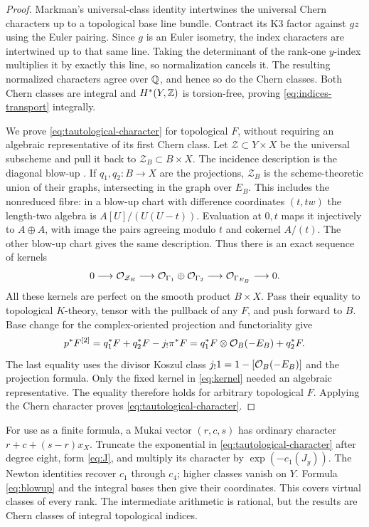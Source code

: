 \begin{proof}
Markman's universal-class identity intertwines the universal Chern
characters up to a topological base line bundle. Contract its K3
factor against $gz$ using the Euler pairing. Since $g$ is an
Euler isometry, the index characters are intertwined up to that
same line. Taking the determinant of the rank-one $y$-index
multiplies it by exactly this line, so normalization cancels it.
The resulting normalized characters agree over $\mathbb Q$, and hence
so do the Chern classes. Both Chern classes are integral and
$H^*(Y,\mathbb Z)$ is torsion-free, proving
\eqref{eq:indices-transport} integrally.

We prove \eqref{eq:tautological-character} for topological $F$,
without requiring an algebraic representative of its first
Chern class. Let $\mathcal Z\subset Y\times X$ be the
universal subscheme and pull it back to $\mathcal Z_B\subset
B\times X$. The incidence description is the diagonal blow-up
\cite[\S10, diagram~(54)]{sv}. If $q_1,q_2:B\to X$
are the projections, $\mathcal Z_B$ is the scheme-theoretic
union of their graphs, intersecting in the graph over $E_B$.
This includes the nonreduced fibre: in a blow-up chart with
difference coordinates $(t,tw)$ the length-two algebra is
$A[U]/(U(U-t))$. Evaluation at $0,t$ maps it injectively to
$A\oplus A$, with image the pairs agreeing modulo $t$ and
cokernel $A/(t)$. The other blow-up chart gives the same
description. Thus there is an exact sequence of kernels
\begin{equation}\label{eq:kernel}
 0\longrightarrow\mathcal O_{\mathcal Z_B}\longrightarrow
 \mathcal O_{\Gamma_1}\oplus\mathcal O_{\Gamma_2}\longrightarrow
 \mathcal O_{\Gamma_{E_B}}\longrightarrow0.
\end{equation}
All these kernels are perfect on the smooth product $B\times X$.
Pass their equality to topological $K$-theory, tensor with the
pullback of any $F$, and push forward to $B$. Base change for
the complex-oriented projection and functoriality give
\[
 p^*F^{[2]}=q_1^*F+q_2^*F-j_!\pi^*F
           =q_1^*F\otimes\mathcal O_B(-E_B)+q_2^*F.
\]
The last equality uses the divisor Koszul class
$j_!1=1-[\mathcal O_B(-E_B)]$ and the projection formula. Only the
fixed kernel in \eqref{eq:kernel} needed an algebraic
representative. The equality therefore holds for arbitrary
topological $F$. Applying the Chern character proves
\eqref{eq:tautological-character}.
\end{proof}

For use as a finite formula, a Mukai vector $(r,c,s)$ has
ordinary character $r+c+(s-r)x_X$. Truncate the exponential
in \eqref{eq:tautological-character} after degree eight,
form \eqref{eq:J}, and multiply its character by
$\exp(-c_1(J_y))$. The Newton identities recover $c_1$ through
$c_4$; higher classes vanish on $Y$. Formula
\eqref{eq:blowup} and the integral bases then give their
coordinates. This covers virtual classes of every rank.
The intermediate arithmetic is rational, but the results are
Chern classes of integral topological indices.

